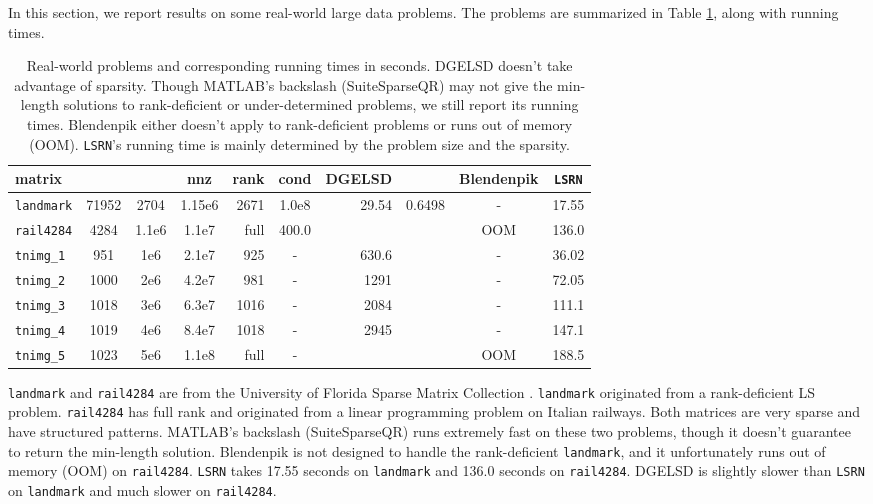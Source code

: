 \documentclass{siamltex}
\begin{document}
In this section, we report results on some real-world large data problems.  The
problems are summarized in Table \ref{tab:real-world-prob}, along with running
times.
\begin{table}
  \centering
  \caption{Real-world problems and corresponding running times in
    seconds. DGELSD doesn't take advantage of sparsity. Though MATLAB's backslash
    (SuiteSparseQR) may not give the min-length solutions to rank-deficient or
    under-determined problems, we still report its running times. Blendenpik either
    doesn't apply to rank-deficient problems or runs out of memory
    (OOM). \texttt{LSRN}'s running time is mainly determined by the problem size
    and the sparsity.}
  \scriptsize
  \newcommand{\z}{\phantom0}
  \begin{tabular}{l||c|c|c|r|c||r|r|c|c}
    matrix &  &  & nnz & rank & cond & DGELSD &  & Blendenpik & \texttt{LSRN} \\
    \hline
    \texttt{landmark} & 71952 & 2704 & 1.15e6 & 2671 & 1.0e8 & 29.54\z & 0.6498 &  - &  17.55 \\
    \texttt{rail4284} & 4284 & 1.1e6 & 1.1e7 & full & 400.0 & \z &  & OOM & 136.0 \\
    \hline
    \texttt{tnimg\_1} &\z951 & 1e6 & 2.1e7 & 925 & - & 630.6\z &  & - & 36.02 \\
    \texttt{tnimg\_2} & 1000 & 2e6 & 4.2e7 & 981 & - & 1291\z &  & - & 72.05 \\
    \texttt{tnimg\_3} & 1018 & 3e6 & 6.3e7 & 1016 & - & 2084\z &  & - & 111.1 \\
    \texttt{tnimg\_4} & 1019 & 4e6 & 8.4e7 & 1018 & - &  2945\z &  & - & 147.1 \\
    \texttt{tnimg\_5} & 1023 & 5e6 & 1.1e8 & full &  - & \z &  & OOM & 188.5 \\
  \end{tabular}
  \label{tab:real-world-prob}
\end{table}

\texttt{landmark} and \texttt{rail4284} are from the University of Florida
Sparse Matrix Collection \cite{davis1997university}. \texttt{landmark}
originated from a rank-deficient LS problem. \texttt{rail4284} has full rank and
originated from a linear programming problem on Italian railways. Both matrices
are very sparse and have structured patterns. MATLAB's backslash (SuiteSparseQR)
runs extremely fast on these two problems, though it doesn't guarantee to return
the min-length solution. Blendenpik is not designed to handle the rank-deficient
\texttt{landmark}, and it unfortunately runs out of memory (OOM) on
\texttt{rail4284}. \texttt{LSRN} takes 17.55 seconds on \texttt{landmark} and
136.0 seconds on \texttt{rail4284}. DGELSD is slightly slower than \texttt{LSRN}
on \texttt{landmark} and much slower on \texttt{rail4284}.
\end{document}
